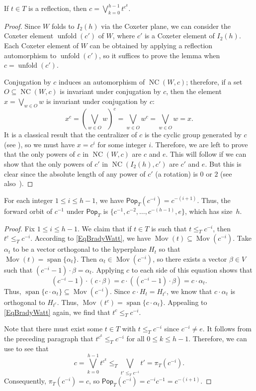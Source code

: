 \documentclass[ALCO,ThmDefs,Unicode,epreuves]{cedram}
\newcommand{\pop}{\mathsf{Pop}}
\DeclareMathOperator{\spn}{span}
\DeclareMathOperator{\NC}{NC}
\DeclareMathOperator{\mov}{Mov}
\DeclareMathOperator{\unfold}{unfold}
\begin{document}
\begin{lemma}\label{Lem:joinofcorbit}
If $t\in T$ is a reflection, then $c=\bigvee\limits_{k=0}^{h-1} t^{c^{k}}$.
\end{lemma}

\begin{proof}
Since $W$ folds to $I_2(h)$ via the Coxeter plane, we can consider the Coxeter element $\unfold(c')$ of $W$, where $c'$ is a Coxeter element of $I_2(h)$. Each Coxeter element of $W$ can be obtained by applying a reflection automorphism to $\unfold(c')$, so it suffices to prove the lemma when $c=\unfold(c')$.

Conjugation by $c$ induces an automorphism of $\NC(W,c)$; therefore, if a set $O \subseteq \NC(W,c)$ is invariant under conjugation by $c$, then the element $x=\bigvee_{w \in O} w$ is invariant under conjugation by $c$:
	\[
x^c = \left(\bigvee_{w \in O} w\right)^c = \bigvee_{w \in O} w^c = \bigvee_{w \in O} w = x.
\]
It is a classical result that the centralizer of $c$ is the cyclic group generated by $c$ (see \cite[Proposition~30]{Carter}), so we must have $x=c^i$ for some integer $i$.  Therefore, we are left to prove that the only powers of $c$ in $\NC(W,c)$ are $c$ and $e$. This will follow if we can show that the only powers of $c'$ in $\NC(I_2(h),c')$ are $c'$ and $e$.  But this is clear since the absolute length of any power of $c'$ (a rotation) is $0$ or $2$ (see also~\cite[Lemma~12.2]{bessis2015finite}).
\end{proof}

\begin{prop}
For each integer $1\leq i\leq h-1$, we have $\pop_T(c^{-i})=c^{-(i+1)}$. Thus, the forward orbit of $c^{-1}$ under $\pop_T$ is $\{c^{-1},c^{-2},\ldots,c^{-(h-1)},e\}$, which has size~$h$.
\label{prop:forward_cinv}
\end{prop}

\begin{proof}
Fix $1\leq i\leq h-1$. We claim that if $t\in T$ is such that $t \leq_T c^{-i}$, then $t^c \leq_T c^{-i}$.  According to \eqref{EqBradyWatt}, we have $\mov(t) \subseteq \mov(c^{-i})$.  Take $\alpha_t$ to be a vector orthogonal to the hyperplane $H_t$ so that $\mov(t) = \spn\{\alpha_t\}$.  Then $\alpha_t\in\mov(c^{-i})$, so there exists a vector $\beta\in V$ such that $(c^{-i}-1)\cdot\beta = \alpha_t$. Applying $c$ to each side of this equation shows that 
\[
(c^{-i}-1)\cdot(c\cdot\beta)=c\cdot((c^{-i}-1)\cdot\beta)=c\cdot\alpha_t.
\]
 Thus, $\spn\{c\cdot\alpha_t\}\subseteq\mov(c^{-i})$. Since $c\cdot H_t=H_{t^c}$, we know that $c\cdot\alpha_t$ is orthogonal to $H_{t^c}$. Thus, $\mov(t^c)=\spn\{c\cdot\alpha_t\}$. Appealing to \eqref{EqBradyWatt} again, we find that $t^c\leq_T c^{-i}$. 

Note that there must exist some $t\in T$ with $t \leq_T c^{-i}$ since $c^{-i} \neq e$. It follows from the preceding paragraph that $t^{c^k}\leq_T c^{-i}$ for all $0\leq k\leq h-1$. Therefore, we can use  to see that 
\[
c=\bigvee\limits_{k=0}^{h-1} t^{c^{k}}\leq_T\bigvee_{t'\leq_T c^{-i}}t'=\pi_T(c^{-i}).
\]
 Consequently, $\pi_T(c^{-i})=c$, so $\pop_T(c^{-i})=c^{-i}c^{-1}=c^{-(i+1)}$. 
\end{proof}
\end{document}
